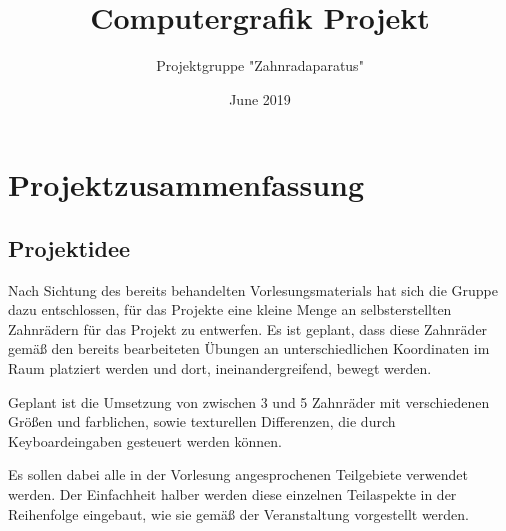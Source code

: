 \documentclass{article}
\title{Computergrafik Projekt}
\author{Projektgruppe "Zahnradaparatus" }
\date{June 2019}
\begin{document}
\maketitle

\section{Projektzusammenfassung}
\subsection{Projektidee}
Nach Sichtung des bereits behandelten Vorlesungsmaterials hat sich die Gruppe dazu entschlossen, 
für das Projekte eine kleine Menge an selbsterstellten 
Zahnrädern für das Projekt zu entwerfen. 
Es ist geplant, dass diese Zahnräder gemäß den bereits bearbeiteten Übungen an unterschiedlichen Koordinaten im Raum platziert werden und dort, ineinandergreifend, bewegt werden. 

Geplant ist die Umsetzung von zwischen 3 und 5 Zahnräder mit verschiedenen Größen und farblichen, sowie texturellen Differenzen, die durch Keyboardeingaben gesteuert werden können. 

Es sollen dabei alle in der Vorlesung angesprochenen Teilgebiete verwendet werden. Der Einfachheit halber werden diese einzelnen Teilaspekte in der Reihenfolge eingebaut, wie sie gemäß der Veranstaltung vorgestellt werden. 
\end{document}
